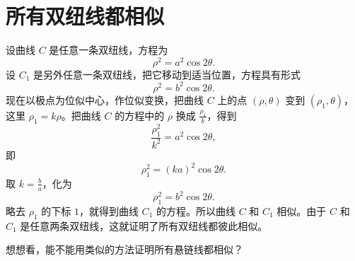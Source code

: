 \section{所有双纽线都相似}

设曲线 $C$ 是任意一条双纽线，方程为
\[
  \rho^2 = a^2 \cos 2\theta.
\]
设 $C_1$ 是另外任意一条双纽线，把它移动到适当位置，方程具有形式
\[
  \rho^2 = b^2 \cos 2\theta.
\]
现在以极点为位似中心，作位似变换，把曲线 $C$ 上的点 $(\rho, \theta)$ 变到 $(\rho_1, \theta)$，这里 $\rho_1 = k\rho$。把曲线 $C$ 的方程中的 $\rho$ 换成 $\frac{\rho_1}{k}$，得到
\[
  \frac{\rho_1^2}{k^2} = a^2 \cos 2\theta,
\]
即
\[
  \rho_1^2 = (ka)^2 \cos 2\theta.
\]
取 $k = \frac{b}{a}$，化为
\[
  \rho_1^2 = b^2 \cos 2\theta.
\]
略去 $\rho_1$ 的下标 $1$，就得到曲线 $C_1$ 的方程。所以曲线 $C$ 和 $C_1$ 相似。由于 $C$ 和 $C_1$ 是任意两条双纽线，这就证明了所有双纽线都彼此相似。

想想看，能不能用类似的方法证明所有悬链线都相似？

